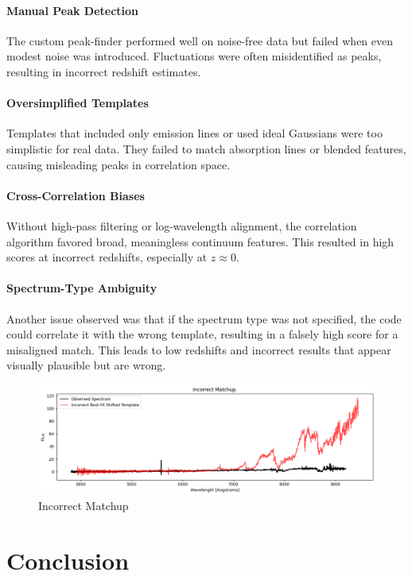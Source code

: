 \documentclass[12pt]{article}
\begin{document}
\paragraph{Manual Peak Detection}
The custom peak-finder performed well on noise-free data but failed when even modest noise was introduced. Fluctuations were often misidentified as peaks, resulting in incorrect redshift estimates.

\paragraph{Oversimplified Templates}
Templates that included only emission lines or used ideal Gaussians were too simplistic for real data. They failed to match absorption lines or blended features, causing misleading peaks in correlation space.

\paragraph{Cross-Correlation Biases}
Without high-pass filtering or log-wavelength alignment, the correlation algorithm favored broad, meaningless continuum features. This resulted in high scores at incorrect redshifts, especially at $z \approx 0$.

\paragraph{Spectrum-Type Ambiguity}
Another issue observed was that if the spectrum type was not specified, the code could correlate it with the wrong template, resulting in a falsely high score for a misaligned match. This leads to low redshifts and incorrect results that appear visually plausible but are wrong.

\begin{figure}[H]
    \centering
    \includegraphics[width=1\linewidth]{image3.png}
    \caption{Incorrect Matchup}
    \label{fig:placeholder}
\end{figure}

\section{Conclusion}
\end{document}
